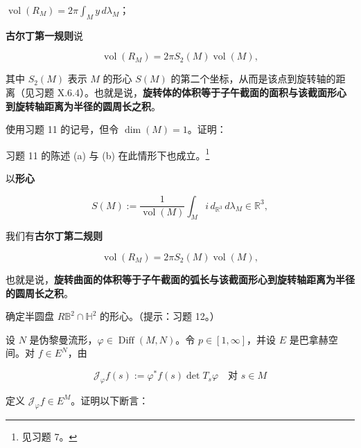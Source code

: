 \begin{exercises}
\begin{items}
$ \operatorname{vol}(R_{M})=2\pi\int_{M}y\,d\lambda_{M} $；

\item

\textbf{古尔丁第一规则}说

\[
\operatorname{vol}(R_{M})=2\pi S_{2}(M)\operatorname{vol}(M),
\]

其中 $ S_{2}(M) $ 表示 $ M $ 的形心 $ S(M) $ 的第二个坐标，从而是该点到旋转轴的距离（见习题 X.6.4）。也就是说，\textbf{旋转体的体积等于子午截面的面积与该截面形心到旋转轴距离为半径的圆周长之积}。

\end{items}

\item

使用习题 11 的记号，但令 $ \dim(M)=1 $。证明：

\begin{items}
\item

习题 11 的陈述 (a) 与 (b) 在此情形下也成立。\footnote{见习题 7。}

\item

以\textbf{形心}

\[
S(M):=\frac{1}{\operatorname{vol}(M)}\int_{M}i\,d_{\mathbb{R}^{3}}\,d\lambda_{M}\in\mathbb{R}^{3},
\]

我们有\textbf{古尔丁第二规则}

\[
\operatorname{vol}(R_{M})=2\pi S_{2}(M)\operatorname{vol}(M),
\]

也就是说，\textbf{旋转曲面的体积等于子午截面的弧长与该截面形心到旋转轴距离为半径的圆周长之积}。

\end{items}

\item

确定半圆盘 $ R\mathbb{B}^{2}\cap\mathbb{H}^{2} $ 的形心。（提示：习题 12。）

\item

设 $ N $ 是伪黎曼流形，$ \varphi\in\operatorname{Diff}(M,N) $。令 $ p\in[1,\infty] $，并设 $ E $ 是巴拿赫空间。对 $ f\in E^{N} $，由

\[
\mathcal{J}_{\varphi}f(s):=\varphi^{\ast}f(s)\det T_{s}\varphi\quad \text{对 } s\in M
\]

定义 $ \mathcal{J}_{\varphi}f\in E^{M} $。证明以下断言：

\begin{items}
\item


\end{items}
\end{exercises}
